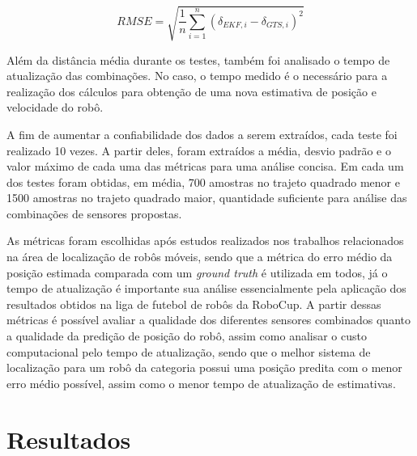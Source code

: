 \documentclass[acronym, symbols, table, deposito]{fei}
\begin{document}
		\begin{equation}\label{eq:rmse_avaliacao}
			RMSE = \sqrt{\frac{1}{n}\sum_{i=1}^{n}(\delta_{EKF, i} - \delta_{GTS, i})^{2}}
		\end{equation}
	
		Além da distância média durante os testes, também foi analisado o tempo de atualização das combinações. No caso, o tempo medido é o necessário para a realização dos cálculos para obtenção de uma nova estimativa de posição e velocidade do robô.
		
		
		A fim de aumentar a confiabilidade dos dados a serem extraídos, cada teste foi realizado 10 vezes. A partir deles, foram extraídos a média, desvio padrão e o valor máximo de cada uma das métricas para uma análise concisa. Em cada um dos testes foram obtidas, em média, 700 amostras no trajeto quadrado menor e 1500 amostras no trajeto quadrado maior, quantidade suficiente para análise das combinações de sensores propostas.
		
		As métricas foram escolhidas após estudos realizados nos trabalhos relacionados na área de localização de robôs móveis, sendo que a métrica do erro médio da posição estimada comparada com um \textit{ground truth} é utilizada em todos, já o tempo de atualização é importante sua análise essencialmente pela aplicação dos resultados obtidos na liga de futebol de robôs  da RoboCup. A partir dessas métricas é possível avaliar a qualidade dos diferentes sensores combinados quanto a qualidade da predição de posição do robô, assim como analisar o custo computacional pelo tempo de atualização, sendo que o melhor sistema de localização para um robô da categoria  possui uma posição predita com o menor erro médio possível, assim como o menor tempo de atualização de estimativas.
		
	\chapter{Resultados} \label{sec:resultados}
	
\end{document}
